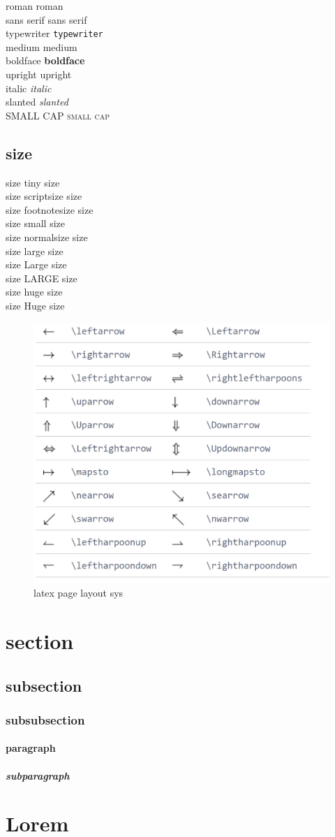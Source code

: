 \documentclass{article}
\begin{document}
\noindent roman \textrm{roman}\\
sans serif \textsf{sans serif}\\
typewriter \texttt{typewriter}\\
medium \textmd{medium}\\
boldface \textbf{boldface}\\  
upright \textup{upright}\\
italic \textit{italic}\\
slanted \textsl{slanted}\\
SMALL CAP \textsc{small cap}\\


\subsection{size}
size tiny {\tiny size}\\
size scriptsize {\scriptsize size}\\
size footnotesize {\footnotesize size}\\
size small {\small size}\\
size normalsize {\normalsize size}\\
size large {\large size}\\
size Large {\Large size}\\
size LARGE {\LARGE size}\\
size huge {\huge size}\\
size Huge {\Huge size}


\begin{figure}[h]
  \centering
  \includegraphics[width=0.5\linewidth]{latex-math-arrows.png}
  \caption{latex page layout sys}
  \label{fig:latex-lmath-arrows}
\end{figure}

\section{section}
\lipsum[3]
\subsection{subsection}
\lipsum[10]
\subsubsection{subsubsection}
\lipsum[1-2]
\paragraph{paragraph}
\lipsum[2-3]
\subparagraph{subparagraph}
\lipsum[1-2]

\section{Lorem}
\lipsum[1-5]
\end{document}

